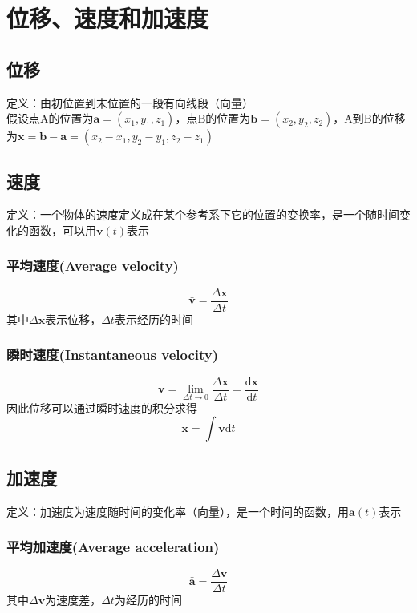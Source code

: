 \documentclass[a4paper,oneside,12pt]{article}
\newcommand{\bol}[1]{\textbf{#1}}
\newcommand{\diff}{\mathrm{d}}
\begin{document}
\section{位移、速度和加速度}
\subsection{位移}
定义：由初位置到末位置的一段有向线段（向量）\\
假设点A的位置为$\bol{a} = (x_1, y_1, z_1)$，点B的位置为$\bol{b} = (x_2, y_2, z_2)$，A到B的位移为$\bol{x} = \bol{b} - \bol{a} = (x_2 - x_1 , y_2 - y_1, z_2 - z_1)$
\subsection{速度}
定义：一个物体的速度定义成在某个参考系下它的位置的变换率，是一个随时间变化的函数，可以用$\bol{v}(t)$表示
\subsubsection{平均速度(Average velocity)}
\begin{displaymath}
	\bar{\bol{v}} = \frac{\Delta \bol{x}}{\Delta t}
\end{displaymath}
其中$\Delta \bol{x}$表示位移，$\Delta t$表示经历的时间
\subsubsection{瞬时速度(Instantaneous velocity)}
\begin{displaymath}
	\bol{v} = \lim_{\Delta t \to 0}\frac{\Delta \bol{x}}{\Delta t} = \frac{\diff\bol{x}}{\diff t}
\end{displaymath}
因此位移可以通过瞬时速度的积分求得
\begin{displaymath}
\bol{x} = \int\bol{v}\diff t
\end{displaymath}
\subsection{加速度}
定义：加速度为速度随时间的变化率（向量），是一个时间的函数，用$\bol{a}(t)$表示
\subsubsection{平均加速度(Average acceleration)}
\begin{displaymath}
	\bar{\bol{a}} = \frac{\Delta \bol{v}}{\Delta t}
\end{displaymath}
其中$\Delta \bol{v}$为速度差，$\Delta t$为经历的时间
\end{document}
